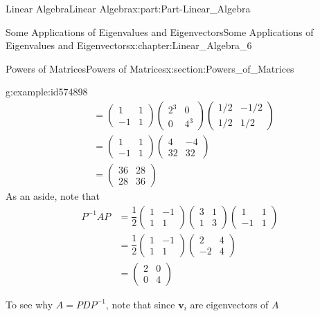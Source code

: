 \documentclass[oneside,10pt,]{book}
\numberwithin{equation}{section}
\newcommand{\bm}[1]{\boldsymbol{#1}}
\newcommand{\amp}{&}
\begin{document}
\begin{partptx}{Linear Algebra}{}{Linear Algebra}{}{}{x:part:Part-Linear_Algebra}
\begin{chapterptx}{Some Applications of Eigenvalues and Eigenvectors}{}{Some Applications of Eigenvalues and Eigenvectors}{}{}{x:chapter:Linear_Algebra_6}
\begin{sectionptx}{Powers of Matrices}{}{Powers of Matrices}{}{}{x:section:Powers_of_Matrices}
\begin{example}{}{g:example:id574898}
\begin{align*}
\amp = \begin{pmatrix} 1 \amp 1 \\ -1 \amp 1 \end{pmatrix} \begin{pmatrix} 2^3 \amp 0 \\ 0 \amp 4^3 \end{pmatrix} \begin{pmatrix} 1/2 \amp -1/2 \\ 1/2 \amp 1/2 \end{pmatrix}\\
\amp = \begin{pmatrix} 1 \amp 1 \\ -1 \amp 1 \end{pmatrix} \begin{pmatrix} 4 \amp -4 \\ 32 \amp 32 \end{pmatrix}\\
\amp = \begin{pmatrix} 36 \amp 28 \\ 28 \amp 36 \end{pmatrix}
\end{align*}
As an aside, note that%
\begin{align*}
P^{-1} AP \amp = \dfrac{1}{2} \begin{pmatrix} 1 \amp -1 \\ 1 \amp 1 \end{pmatrix} \begin{pmatrix} 3 \amp 1 \\ 1 \amp 3 \end{pmatrix} \begin{pmatrix} 1 \amp 1 \\ -1 \amp 1 \end{pmatrix}\\
\amp = \dfrac{1}{2} \begin{pmatrix} 1 \amp -1 \\ 1 \amp 1 \end{pmatrix} \begin{pmatrix} 2 \amp 4 \\ -2 \amp 4 \end{pmatrix}\\
\amp = \begin{pmatrix} 2 \amp 0 \\ 0 \amp 4 \end{pmatrix}
\end{align*}
%
\end{example}
To see why \(A = PDP^{-1}\), note that since \(\bm{v}_i\) are eigenvectors of \(A\)%

\end{sectionptx}
\end{chapterptx}
\end{partptx}
\end{document}
